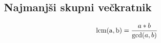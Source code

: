 \documentclass[10pt,a4paper,oneside]{book}
\begin{document}
\subsection{Najmanjši skupni večkratnik}

\[ \operatorname{lcm(a,b)}={a*b \over \operatorname{gcd}(a,b)}\]
%

\end{document}
